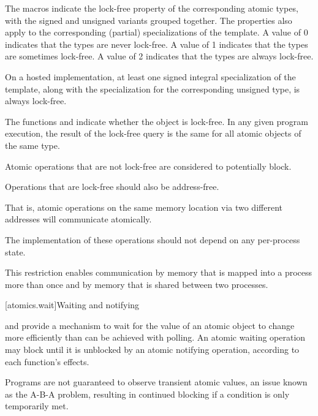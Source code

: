 \pnum
The  macros indicate the lock-free property of the
corresponding atomic types, with the signed and unsigned variants grouped
together. The properties also apply to the corresponding (partial) specializations of the
 template. A value of 0 indicates that the types are never
lock-free. A value of 1 indicates that the types are sometimes lock-free. A
value of 2 indicates that the types are always lock-free.

\pnum
On a hosted implementation,
at least one signed integral specialization of the  template,
along with the specialization
for the corresponding unsigned type,
is always lock-free.

\pnum
The functions  and
indicate whether the object is lock-free. In any given program execution, the
result of the lock-free query
is the same for all atomic objects of the same type.

\pnum
Atomic operations that are not lock-free are considered to potentially
block.

\pnum
\recommended
Operations that are lock-free should also be address-free.
\begin{footnote}
That is,
atomic operations on the same memory location via two different addresses will
communicate atomically.
\end{footnote}
The implementation of these operations should not depend on any per-process state.
\begin{note}
This restriction enables communication by memory that is
mapped into a process more than once and by memory that is shared between two
processes.
\end{note}

[atomics.wait]{Waiting and notifying}

\pnum
{}
and 
provide a mechanism to wait for the value of an atomic object to change
more efficiently than can be achieved with polling.
An atomic waiting operation may block until it is unblocked
by an atomic notifying operation, according to each function's effects.
\begin{note}
Programs are not guaranteed to observe transient atomic values,
an issue known as the A-B-A problem,
resulting in continued blocking if a condition is only temporarily met.
\end{note}

